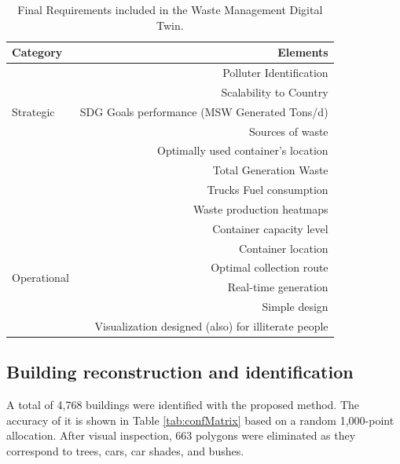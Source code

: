 \documentclass[authoryear,preprint,review,12pt]{elsarticle}
\begin{document}
    \begin{table}[h]
        \centering
        \caption{Final Requirements included in the Waste Management Digital Twin.}
        \scriptsize
        \label{tab:finalReq}
        \begin{tabularx}{\columnwidth}{X r}
            \toprule
            Category&Elements\\
            \midrule
            \multirow{5}{*}{Strategic}&Polluter Identification\\
                                        &Scalability to Country\\
                                        &SDG Goals performance (MSW Generated Tons/d)\\
                                        &Sources of waste\\
            \midrule
            \multirow{4}{*}{Performance}&Optimally used container's location\\
                                        &Total Generation Waste\\
                                        &Trucks Fuel consumption\\
                                        &Waste production heatmaps\\
            \midrule
            \multirow{6}{*}{Operational}&Container capacity level\\
                                        &Container location\\
                                        &Optimal collection route\\
                                        &Real-time generation\\
                                        &Simple design\\
                                        &Visualization designed (also) for illiterate people\\
            \bottomrule        
        \end{tabularx}
    \end{table}

    \subsection{Building reconstruction and identification} \label{subsec:buildings}
    A total of 4,768 buildings were identified with the proposed method. The accuracy of it is shown in Table \ref{tab:confMatrix} based on a random 1,000-point allocation. After visual inspection, 663 polygons were eliminated as they correspond to trees, cars, car shades, and bushes.
\end{document}
